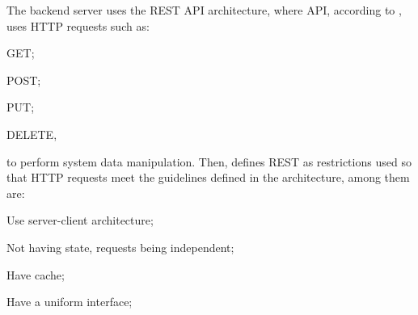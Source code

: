 \begin{description}
    
    The backend server uses the REST API architecture, where \ac{API}, according to \textcite{restApi}, uses \ac{HTTP} requests such as:
    \begin{inparaenum}[(1)]
      \item GET;
      \item POST;
      \item PUT;
      \item DELETE, 
    \end{inparaenum} to perform system data manipulation. Then, \textcite{restApi} defines \ac{REST} as restrictions used so that \ac{HTTP} requests meet the guidelines defined in the architecture, among them are:
    \begin{inparaenum}[(1)]
      \item Use server-client architecture;
      \item Not having state, requests being independent;
      \item Have cache;
      \item Have a uniform interface;
    \end{inparaenum}
    
    

\end{description}
